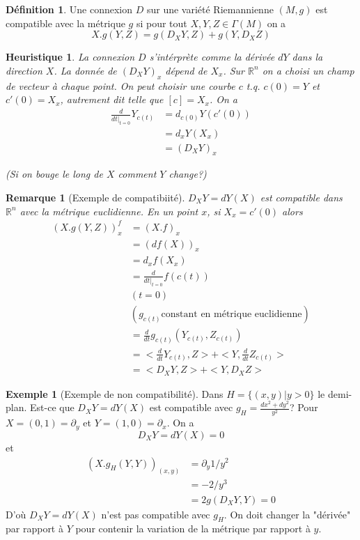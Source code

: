 \documentclass[a4paper,12pt]{book}
\newcommand{\R}{\mathbb{R}}
\theoremstyle{plain}
\newtheorem{heur}{Heuristique}
\newtheorem{rem}{Remarque}
\theoremstyle{definition}
\newtheorem{defn}[subsection]{Définition}
\newtheorem{ex}[subsection]{Exemple}
\theoremstyle{remark}
\begin{document}
\begin{defn}
    Une connexion $D$ sur une variété Riemannienne $(M,g)$ est 
    compatible avec la métrique $g$ si pour tout $X,Y,Z\in \Gamma(M)$
    on a 
    \[X.g(Y,Z)=g(D_XY,Z)+g(Y,D_XZ)\]
\end{defn}

\begin{heur}
    La connexion $D$ s'intérprète comme la dérivée $dY$ dans la 
    direction $X$. La donnée de $(D_XY)_x$ dépend de $X_x$. Sur $\R^n$
    on a choisi un champ de vecteur à chaque point. On peut choisir
    une courbe $c$ t.q. $c(0)=Y$ et $c'(0)=X_x$, autrement dit
    telle que $[c]=X_x$. On a 
    \begin{align*}
    \frac{d}{dt|_{t=0}}Y_{c(t)}&=d_{c(0)}Y(c'(0))\\
                               &=d_xY(X_x)\\
                               &=(D_XY)_x
    \end{align*}

    (Si on bouge le long de $X$ comment $Y$ change?)
\end{heur}
\begin{rem}[Exemple de compatibiité]
    $D_XY=dY(X)$ est compatible dans $\R^n$ avec la métrique euclidienne.
    En un point $x$, si $X_x=c'(0)$ alors
    \begin{align*}
        (X.g(Y,Z))^f_x&=(X.f)_x\\
                      &=(df(X))_x\\
                      &=d_xf(X_x)\\
                      &=\frac{d}{dt|_{t=0}}f(c(t))\\
                      &(t=0)\\
                      &(g_{c(t)} \textrm{constant en métrique euclidienne})\\
                      &=\frac{d}{dt}g_{c(t)}(Y_{c(t)},Z_{c(t)})\\
                      &=<\frac{d}{dt}Y_{c(t)},Z>+<Y,\frac{d}{dt}Z_{c(t)}>\\
                      &=<D_XY,Z>+<Y,D_XZ>
    \end{align*}
\end{rem}

\begin{ex}[Exemple de non compatibilité]
    Dans $H=\{(x,y)|y>0\}$ le demi-plan. Est-ce que $D_XY=dY(X)$ est 
    compatible avec $g_H=\frac{dx^2+dy^2}{y^2}$? Pour 
    $X=(0,1)=\partial_y$ et $Y=(1,0)=\partial_x$. On a 
    \[D_XY=dY(X)=0\]
    et 
    \begin{align*}
        (X.g_H(Y,Y))_{(x,y)}&=\partial_y1/y^2\\
                            &=-2/y^3\\
                            &=2g(D_XY,Y)=0
    \end{align*}
    D'où $D_XY=dY(X)$ n'est pas compatible avec $g_H$. On doit changer
    la "dérivée" par rapport à $Y$ pour contenir la variation de la 
    métrique par rapport à $y$.
\end{ex}
\end{document}
